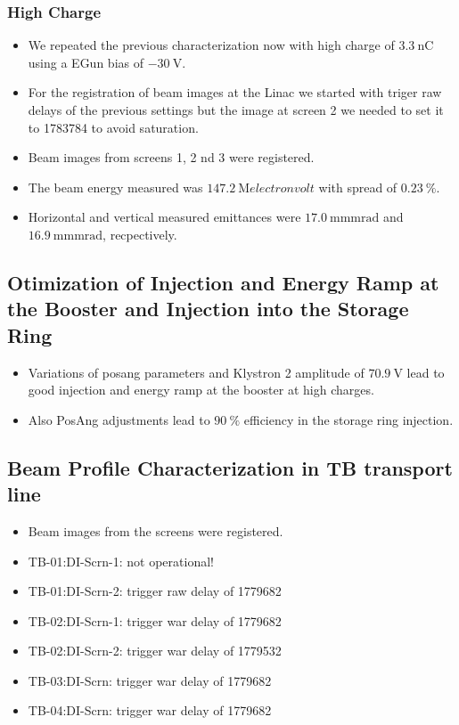 \documentclass{article}
\begin{document}
\subsubsection{High Charge}
\begin{itemize}
\item We repeated the previous characterization now with high charge of $\SI{3.3}{\nano\coulomb}$ using a EGun bias of $\SI{-30}{\volt}$. 
\item For the registration of beam images at the Linac we started with triger raw delays of the previous settings but the image at screen 2 we needed to set it to 1783784 to avoid saturation.
\item Beam images from screens 1, 2 nd 3 were registered.
\item The beam energy measured was $\SI{147.2}{\mega electronvolt}$ with spread of $\SI{0.23}{\percent}$.
\item Horizontal and vertical measured emittances were $\SI{17.0}{\milli\meter \milli\radian}$ and $\SI{16.9}{\milli\meter \milli\radian}$, recpectively.
\end{itemize}


\subsection{Otimization of Injection and Energy Ramp at the Booster and Injection into the Storage Ring}
\begin{itemize}
    \item Variations of posang parameters and Klystron 2 amplitude of $\SI{70.9}{\volt}$ lead to good injection and energy ramp at the booster at high charges.
    \item Also PosAng adjustments lead to $\SI{90}{\percent}$ efficiency in the storage ring injection.
\end{itemize}


\subsection{Beam Profile Characterization in TB transport line}
\begin{itemize}
    \item Beam images from the screens were registered.
    \item TB-01:DI-Scrn-1: not operational!
    \item TB-01:DI-Scrn-2: trigger raw delay of 1779682
    \item TB-02:DI-Scrn-1: trigger war delay of 1779682
    \item TB-02:DI-Scrn-2: trigger war delay of 1779532
    \item TB-03:DI-Scrn: trigger war delay of 1779682
    \item TB-04:DI-Scrn: trigger war delay of 1779682
\end{itemize}
\end{document}
